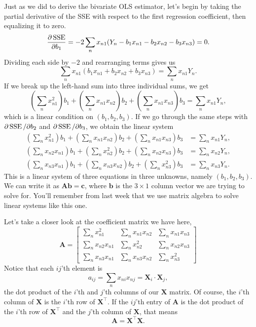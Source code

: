 \documentclass[12pt,oneside,openany]{book}
\begin{document}
Just as we did to derive the bivariate OLS estimator, let's begin by
taking the partial derivative of the SSE with respect to the first
regression coefficient, then equalizing it to zero. \[
\frac{\partial \mathop{\rm SSE}\nolimits}{\partial b_1}
= -2 \sum_n x_{n1} (Y_n - b_1 x_{n1} - b_2 x_{n2} - b_3 x_{n3})
= 0.
\] Dividing each side by \(-2\) and rearranging terms gives us \[
\sum_n x_{n1} (b_1 x_{n1} + b_2 x_{n2} + b_3 x_{n3}) = \sum_n x_{n1} Y_n.
\] If we break up the left-hand sum into three individual sums, we get
\[
\left( \sum_n x_{n1}^2 \right) b_1 + \left( \sum_n x_{n1} x_{n2} \right) b_2 + \left( \sum_n x_{n1} x_{n3} \right) b_3 = \sum_n x_{n1} Y_n,
\] which is a linear condition on \((b_1, b_2, b_3)\). If we go through
the same steps with \(\partial \mathop{\rm SSE}\nolimits/ \partial b_2\) and
\(\partial \mathop{\rm SSE}\nolimits / \partial b_3\), we obtain the linear system \[
\begin{aligned}
\left( \sum_n x_{n1}^2 \right) b_1 + \left( \sum_n x_{n1} x_{n2} \right) b_2 + \left( \sum_n x_{n1} x_{n3} \right) b_3 &= \sum_n x_{n1} Y_n, \\
\left( \sum_n x_{n2} x_{n1} \right) b_1 + \left( \sum_n x_{n2}^2 \right) b_2 + \left( \sum_n x_{n2} x_{n3} \right) b_3 &= \sum_n x_{n2} Y_n, \\
\left( \sum_n x_{n3} x_{n1} \right) b_1 + \left( \sum_n x_{n3} x_{n2} \right) b_2 + \left( \sum_n x_{n3}^2 \right) b_3 &= \sum_n x_{n3} Y_n.
\end{aligned}
\] This is a linear system of three equations in three unknowns, namely
\((b_1, b_2, b_3)\). We can write it as
\(\mathbf{A} \mathbf{b} = \mathbf{c}\), where \(\mathbf{b}\) is the
\(3 \times 1\) column vector we are trying to solve for. You'll remember
from last week that we use matrix algebra to solve linear systems like
this one.

Let's take a closer look at the coefficient matrix we have here, \[
\mathbf{A} =
\begin{bmatrix}
\sum_n x_{n1}^2 & \sum_n x_{n1} x_{n2} & \sum_n x_{n1} x_{n3} \\
\sum_n x_{n2} x_{n1} & \sum_n x_{n2}^2 & \sum_n x_{n2} x_{n3} \\
\sum_n x_{n3} x_{n1} & \sum_n x_{n3} x_{n2} & \sum_n x_{n3}^2
\end{bmatrix}
\] Notice that each \(ij\)'th element is \[
a_{ij} = \sum_n x_{ni} x_{nj} = \mathbf{X}_i \cdot \mathbf{X}_j,
\] the dot product of the \(i\)'th and \(j\)'th columns of our
\(\mathbf{X}\) matrix. Of course, the \(i\)'th column of \(\mathbf{X}\)
is the \(i\)'th row of \(\mathbf{X}^\top\). If the \(ij\)'th entry of
\(\mathbf{A}\) is the dot product of the \(i\)'th row of
\(\mathbf{X}^\top\) and the \(j\)'th column of \(\mathbf{X}\), that
means \[
\mathbf{A} = \mathbf{X}^\top \mathbf{X}.
\]
\end{document}

